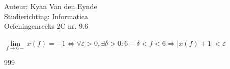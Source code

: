 \documentclass[a4paper]{article}
\begin{document}
  
\noindent \large Auteur: Kyan Van den Eynde \\
\noindent \large Studierichting: Informatica\\
\noindent \large Oefeningenreeks 2C nr. 9.6\\

\medskip

\normalsize

$\lim\limits_{f \rightarrow 6-} x(f) = -1 \Leftrightarrow \forall \varepsilon > 0, \exists \delta > 0 : 6 - \delta < f < 6 \Rightarrow |x(f) +1| < \varepsilon$\\

\begin{thebibliography}{999}
\end{thebibliography}
\end{document}
